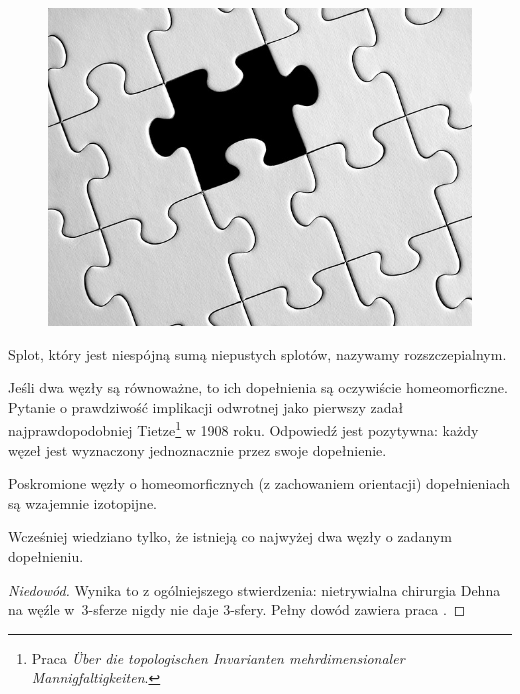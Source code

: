 \begin{example}
\begin{figure}[H]
\begin{minipage}[b]{.32\linewidth}
		\end{minipage}
		\begin{minipage}[b]{.32\linewidth}
			\centering
			\includegraphics[width=\linewidth]{../data/missing.jpg}
		\end{minipage}
	\end{figure}
\end{example}

\begin{definition}[rozszczepialność]
	Splot, który jest niespójną sumą niepustych splotów, nazywamy rozszczepialnym.
\end{definition}

Jeśli dwa węzły są równoważne, to ich dopełnienia są oczywiście homeomorficzne.
Pytanie o prawdziwość implikacji odwrotnej jako pierwszy zadał najprawdopodobniej Tietze\footnote{Praca \emph{Über die topologischen Invarianten mehrdimensionaler Mannigfaltigkeiten}.} w 1908 roku.
Odpowiedź jest pozytywna: każdy węzeł jest wyznaczony jednoznacznie przez swoje dopełnienie.

\begin{theorem} \label{thm_gordon_luecke}
	Poskromione węzły o homeomorficznych (z zachowaniem orientacji) dopełnieniach są wzajemnie izotopijne.
\end{theorem}

Wcześniej wiedziano tylko, że istnieją co najwyżej dwa węzły o zadanym dopełnieniu.

\begin{proof}[Niedowód]
	Wynika to z ogólniejszego stwierdzenia:
	nietrywialna chirurgia Dehna na węźle w~3-sferze nigdy nie daje 3-sfery.
	Pełny dowód zawiera praca \cite{gordon89}.
\end{proof}

